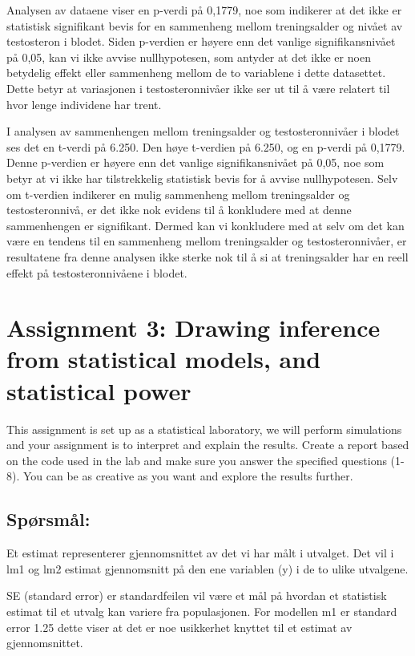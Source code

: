 \documentclass[
  letterpaper,
  DIV=11,
  numbers=noendperiod]{scrreprt}
\begin{document}
Analysen av dataene viser en p-verdi på 0,1779, noe som indikerer at det
ikke er statistisk signifikant bevis for en sammenheng mellom
treningsalder og nivået av testosteron i blodet. Siden p-verdien er
høyere enn det vanlige signifikansnivået på 0,05, kan vi ikke avvise
nullhypotesen, som antyder at det ikke er noen betydelig effekt eller
sammenheng mellom de to variablene i dette datasettet. Dette betyr at
variasjonen i testosteronnivåer ikke ser ut til å være relatert til hvor
lenge individene har trent.

I analysen av sammenhengen mellom treningsalder og testosteronnivåer i
blodet ses det en t-verdi på 6.250. Den høye t-verdien på 6.250, og en
p-verdi på 0,1779. Denne p-verdien er høyere enn det vanlige
signifikansnivået på 0,05, noe som betyr at vi ikke har tilstrekkelig
statistisk bevis for å avvise nullhypotesen. Selv om t-verdien indikerer
en mulig sammenheng mellom treningsalder og testosteronnivå, er det ikke
nok evidens til å konkludere med at denne sammenhengen er signifikant.
Dermed kan vi konkludere med at selv om det kan være en tendens til en
sammenheng mellom treningsalder og testosteronnivåer, er resultatene fra
denne analysen ikke sterke nok til å si at treningsalder har en reell
effekt på testosteronnivåene i blodet.


\chapter{Assignment 3: Drawing inference from statistical models, and
statistical power}\label{assignment3}

This assignment is set up as a statistical laboratory, we will perform
simulations and your assignment is to interpret and explain the results.
Create a report based on the code used in the lab and make sure you
answer the specified questions (1-8). You can be as creative as you want
and explore the results further.

\section{Spørsmål:}\label{spuxf8rsmuxe5l}

Et estimat representerer gjennomsnittet av det vi har målt i utvalget.
Det vil i lm1 og lm2 estimat gjennomsnitt på den ene variablen (y) i de
to ulike utvalgene.

SE (standard error) er standardfeilen vil være et mål på hvordan et
statistisk estimat til et utvalg kan variere fra populasjonen. For
modellen m1 er standard error 1.25 dette viser at det er noe usikkerhet
knyttet til et estimat av gjennomsnittet.
\end{document}
